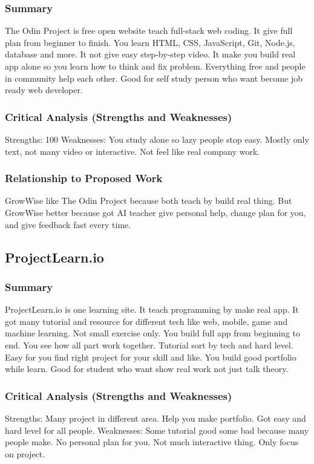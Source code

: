 \documentclass{FastFyp}
\begin{document}
\subsubsection{Summary}
The Odin Project \cite{ref:TheOdinProject} is free open website teach full-stack web coding. It give full plan from beginner to finish. You learn HTML, CSS, JavaScript, Git, Node.js, database and more. It not give easy step-by-step video. It make you build real app alone so you learn how to think and fix problem. Everything free and people in community help each other. Good for self study person who want become job ready web developer.

\subsubsection{Critical Analysis (Strengths and Weaknesses)}
Strengths: 100%
Weaknesses: You study alone so lazy people stop easy. Mostly only text, not many video or interactive. Not feel like real company work.

\subsubsection{Relationship to Proposed Work}
GrowWise like The Odin Project because both teach by build real thing. But GrowWise better because got AI teacher give personal help, change plan for you, and give feedback fast every time.
\subsection{ProjectLearn.io}

\subsubsection{Summary}
ProjectLearn.io \cite{ref:ProjectLearn} is one learning site. It teach programming by make real app. It got many tutorial and resource for different tech like web, mobile, game and machine learning. Not small exercise only. You build full app from beginning to end. You see how all part work together. Tutorial sort by tech and hard level. Easy for you find right project for your skill and like. You build good portfolio while learn. Good for student who want show real work not just talk theory.

\subsubsection{Critical Analysis (Strengths and Weaknesses)}
Strengths: Many project in different area. Help you make portfolio. Got easy and hard level for all people.  
Weaknesses: Some tutorial good some bad because many people make. No personal plan for you. Not much interactive thing. Only focus on project.
\end{document}
